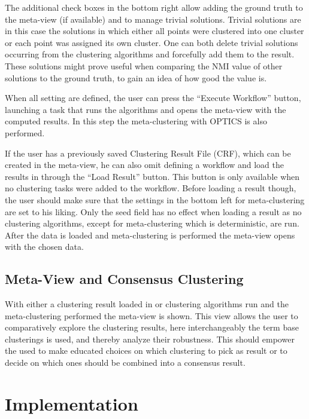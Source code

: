 \documentclass[
	a4paper,
	english,
	twoside,
	openright,               
	11pt                            
	]{report}
\begin{document}
The additional check boxes in the bottom right allow adding the ground truth to the meta-view (if available) and to manage trivial solutions. Trivial solutions are in this case the solutions in which either all points were clustered into one cluster or each point was assigned its own cluster. One can both delete trivial solutions occurring from the clustering algorithms and forcefully add them to the result. These solutions might prove useful when comparing the NMI value of other solutions to the ground truth, to gain an idea of how good the value is.

When all setting are defined, the user can press the ``Execute Workflow'' button, launching a task that runs the algorithms and opens the meta-view with the computed results. In this step the meta-clustering with OPTICS \cite{10.1145/304181.304187} is also performed.

If the user has a previously saved Clustering Result File (CRF), which can be created in the meta-view, he can also omit defining a workflow and load the results in through the ``Load Result'' button. This button is only available when no clustering tasks were added to the workflow. Before loading a result though, the user should make sure that the settings in the bottom left for meta-clustering are set to his liking. Only the seed field has no effect when loading a result as no clustering algorithms, except for meta-clustering which is deterministic, are run. After the data is loaded and meta-clustering is performed the meta-view opens with the chosen data.

\section{Meta-View and Consensus Clustering}
With either a clustering result loaded in or clustering algorithms run and the meta-clustering performed the meta-view is shown. This view allows the user to comparatively explore the clustering results, here interchangeably the term base clusterings is used, and thereby analyze their robustness. This should empower the used to make educated choices on which clustering to pick as result or to decide on which ones should be combined into a consensus result.













\chapter{Implementation}\label{cha:impl}
\end{document}
